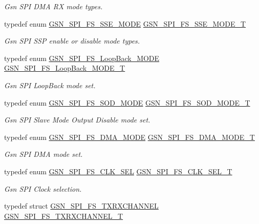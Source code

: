\begin{DoxyCompactItemize}
\begin{DoxyCompactList}\small\item\em Gsn SPI DMA RX mode types. \end{DoxyCompactList}\item 
typedef enum \hyperlink{a00655_ga9d787cd2d26e81bd00ce1a1392958e27}{GSN\_\-SPI\_\-FS\_\-SSE\_\-MODE} \hyperlink{a00655_ga05ccf14c3c0d97e7e9fb2d52bf5081de}{GSN\_\-SPI\_\-FS\_\-SSE\_\-MODE\_\-T}
\begin{DoxyCompactList}\small\item\em Gsn SPI SSP enable or disable mode types. \end{DoxyCompactList}\item 
typedef enum \hyperlink{a00655_ga082cec3b28f66e93faf6463fa1b76413}{GSN\_\-SPI\_\-FS\_\-LoopBack\_\-MODE} \hyperlink{a00655_ga721139ec14f269f577231293b4b96dad}{GSN\_\-SPI\_\-FS\_\-LoopBack\_\-MODE\_\-T}
\begin{DoxyCompactList}\small\item\em Gsn SPI LoopBack mode set. \end{DoxyCompactList}\item 
typedef enum \hyperlink{a00655_ga7fdf2844c62b8075aa8d730cc4e17134}{GSN\_\-SPI\_\-FS\_\-SOD\_\-MODE} \hyperlink{a00655_gaa0f62d38ee68880a4e3bb673a05d293d}{GSN\_\-SPI\_\-FS\_\-SOD\_\-MODE\_\-T}
\begin{DoxyCompactList}\small\item\em Gsn SPI Slave Mode Output Disable mode set. \end{DoxyCompactList}\item 
typedef enum \hyperlink{a00655_ga527bb8ce76fef8354e9db5ed16509e26}{GSN\_\-SPI\_\-FS\_\-DMA\_\-MODE} \hyperlink{a00655_ga1348552a2785bfc5647d4b4aa234c64c}{GSN\_\-SPI\_\-FS\_\-DMA\_\-MODE\_\-T}
\begin{DoxyCompactList}\small\item\em Gsn SPI DMA mode set. \end{DoxyCompactList}\item 
typedef enum \hyperlink{a00655_ga19874fb33d92ef82cb6a517ba6c1a5fa}{GSN\_\-SPI\_\-FS\_\-CLK\_\-SEL} \hyperlink{a00655_ga0d31f3f2784c160b1ad748b232f4ae7b}{GSN\_\-SPI\_\-FS\_\-CLK\_\-SEL\_\-T}
\begin{DoxyCompactList}\small\item\em Gsn SPI Clock selection. \end{DoxyCompactList}\item 
typedef struct \hyperlink{a00237}{GSN\_\-SPI\_\-FS\_\-TXRXCHANNEL} \hyperlink{a00655_ga8c9aa14f3eb304db286ecd04e0020447}{GSN\_\-SPI\_\-FS\_\-TXRXCHANNEL\_\-T}

\end{DoxyCompactItemize}
